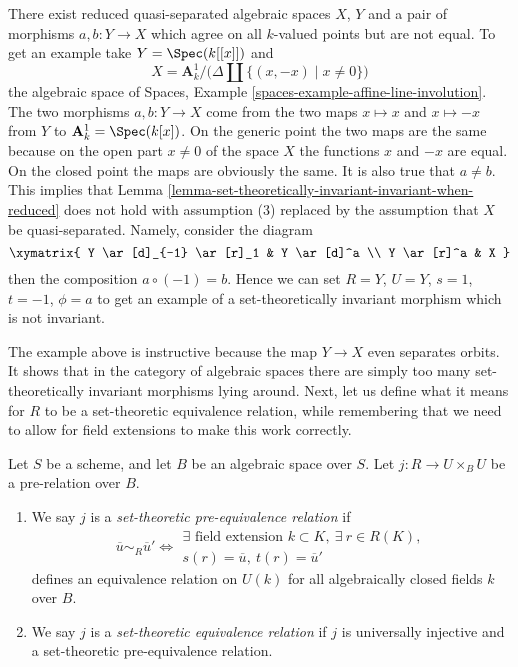 \begin{example}
\label{example-not-invariant}
There exist reduced quasi-separated algebraic spaces $X$, $Y$ and a pair of
morphisms $a, b : Y \to X$ which agree on all $k$-valued points but are not
equal. To get an example take $Y = \Spec(k[[x]])$ and
$$
X = \mathbf{A}^1_k \Big/ \big(\Delta \amalg \{(x, -x) \mid x \not = 0\}\big)
$$
the algebraic space of
Spaces, Example \ref{spaces-example-affine-line-involution}.
The two morphisms $a, b : Y \to X$
come from the two maps $x \mapsto x$ and $x \mapsto -x$
from $Y$ to $\mathbf{A}^1_k = \Spec(k[x])$. On the generic point
the two maps are the same because on the open part $x \not = 0$ of the
space $X$ the functions $x$ and $-x$ are equal. On the closed point
the maps are obviously the same. It is also true that $a \not = b$.
This implies that
Lemma \ref{lemma-set-theoretically-invariant-invariant-when-reduced}
does not hold with assumption (3) replaced by the assumption that $X$
be quasi-separated. Namely, consider the diagram
$$
\xymatrix{
Y \ar[d]_{-1} \ar[r]_1 & Y \ar[d]^a \\
Y \ar[r]^a & X
}
$$
then the composition $a \circ (-1) = b$. Hence we can set $R = Y$,
$U = Y$, $s = 1$, $t = -1$, $\phi = a$ to get an example of a set-theoretically
invariant morphism which is not invariant.
\end{example}

\noindent
The example above is instructive because the map $Y \to X$ even separates
orbits. It shows that in the category of algebraic spaces there are simply
too many set-theoretically invariant morphisms lying around. Next, let us
define what it means for $R$ to be a set-theoretic equivalence relation, while
remembering that we need to allow for field extensions to make this work
correctly.

\begin{definition}
\label{definition-set-theoretic-equivalence}
Let $S$ be a scheme, and let $B$ be an algebraic space over $S$.
Let $j : R \to U \times_B U$ be a pre-relation over $B$.
\begin{enumerate}
\item We say $j$ is a {\it set-theoretic pre-equivalence relation} if
$$
\overline{u} \sim_R \overline{u}'
\Leftrightarrow
\begin{matrix}
\exists\text{ field extension }k \subset K, \ \exists\ r \in R(K), \\
s(r) = \overline{u}, \ t(r) = \overline{u}'
\end{matrix}
$$
defines an equivalence relation on $U(k)$ for all algebraically closed fields
$k$ over $B$.
\item We say $j$ is a {\it set-theoretic equivalence relation}
if $j$ is universally injective and a set-theoretic pre-equivalence
relation.
\end{enumerate}
\end{definition}

